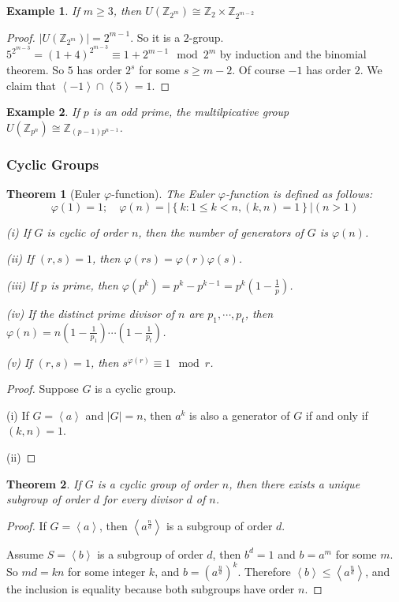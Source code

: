 \documentclass{article}
\newtheorem{Thm}{Theorem}[section]
\newtheorem{Eg}{Example}[section]
\theoremstyle{definition}
\begin{document}
\begin{Eg}
    If $m\ge 3$, then $U(\mathbb{Z}_{2^m})\cong \mathbb{Z}_2\times \mathbb{Z}_{2^{m-2}}$
\end{Eg}
\begin{proof}
    $\left|U(\mathbb{Z}_{2^m})\right|=2^{m-1}$. So it is a $2$-group.
\newline $5^{2^{m-3}}=(1+4)^{2^{m-3}}\equiv 1+2^{m-1}\mod{2^m}$ by induction and the binomial theorem. So $5$ has order $2^s$ for some $s\ge m-2$.
\newline Of course $-1$ has order $2$. We claim that $\left\langle-1\right\rangle\cap\left\langle5\right\rangle=1$.
\end{proof}
\begin{Eg}
    If $p$ is an odd prime, the multilpicative group $U(\mathbb{Z}_{p^n})\cong \mathbb{Z}_{(p-1)p^{n-1}}$.
\end{Eg}


\subsubsection{Cyclic Groups}


\begin{Thm}[Euler $\varphi$-function]
The Euler $\varphi$-function is defined as follows:
\[\varphi(1)=1;\quad \varphi(n)=\left|\left\{k:1\le k<n,(k,n)=1\right\}\right|(n>1)\]\par 
(i) If $G$ is cyclic of order $n$, then the number of generators of $G$ is $\varphi(n)$.\par 
(ii) If $(r,s)=1$, then $\varphi(rs)=\varphi(r)\varphi(s)$.\par 
(iii) If $p$ is prime, then $\varphi(p^k)=p^k-p^{k-1}=p^k(1-\frac{1}{p})$.\par 
(iv) If the distinct prime divisor of $n$ are $p_1,\cdots,p_t$, then $\varphi(n)=n(1-\frac{1}{p_1})\cdots (1-\frac{1}{p_t})$. \par 
(v) If $(r,s)=1$, then $s^{\varphi(r)}\equiv 1 \mod{r}$.
\end{Thm}
\begin{proof}
    Suppose $G$ is a cyclic group.\par 
    (i) If $G=\left\langle a\right\rangle$ and $\left|G\right|=n$, then $a^k$ is also a generator of $G$ if and only if $(k,n)=1$.\par 
    (ii) 
\end{proof}

\begin{Thm}
If $G$ is a cyclic group of order $n$, then there exists a unique subgroup of order $d$ for every divisor $d$ of $n$.
\end{Thm}
\begin{proof}
If $G=\left\langle a\right\rangle$, then $\left\langle a^{\frac{n}{d}}\right\rangle$ is a subgroup of order $d$.\par 
Assume $S=\left\langle b\right\rangle$ is a subgroup of order $d$, then $b^d=1$ and $b=a^m$ for some $m$. So $md=kn$ for some integer $k$, and $b=(a^{\frac{n}{d}})^k$.
Therefore $\left\langle b\right\rangle\le\left\langle a^{\frac{n}{d}}\right\rangle$, and the inclusion is equality because both subgroups have order $n$.
\end{proof}
\end{document}
